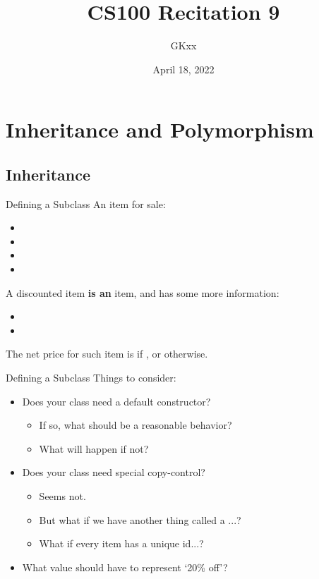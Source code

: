 \documentclass{beamer}
\title{CS100 Recitation 9}
\author{GKxx}
\date{April 18, 2022}
\begin{document}
\begin{frame}
    \maketitle
\end{frame}

\section{Inheritance and Polymorphism}

\subsection{Inheritance}

\begin{frame}{Defining a Subclass}
    An item for sale:
    \begin{itemize}
        \item {}
        \item {}
        \item {}
        \item {}
    \end{itemize}
    A discounted item \textbf{is an} item, and has some more information:
    \begin{itemize}
        \item {}
        \item {}
    \end{itemize}
    The net price for such item is  if , or  otherwise.
\end{frame}

\begin{frame}{Defining a Subclass}
    Things to consider:
    \begin{itemize}
        \item Does your class need a default constructor?
        \begin{itemize}
            \item If so, what should be a reasonable behavior?
            \item What will happen if not?
        \end{itemize}
        \item Does your class need special copy-control?
        \begin{itemize}
            \item Seems not.
            \item But what if we have another thing called a ...?
            \item What if every item has a unique id...?
        \end{itemize}
        \item What value should  have to represent `20\% off'?
    \end{itemize}
\end{frame}
\end{document}
